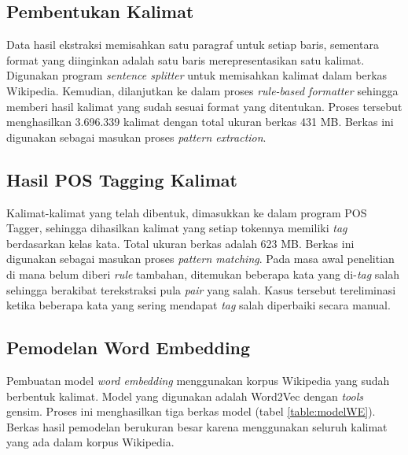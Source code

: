 \subsection{Pembentukan Kalimat}
Data hasil ekstraksi memisahkan satu paragraf untuk setiap baris, sementara format yang diinginkan adalah satu baris merepresentasikan satu kalimat. Digunakan program \textit{sentence splitter} untuk memisahkan kalimat dalam berkas Wikipedia. Kemudian, dilanjutkan ke dalam proses \textit{rule-based formatter} sehingga memberi hasil kalimat yang sudah sesuai format yang ditentukan. Proses tersebut menghasilkan 3.696.339 kalimat dengan total ukuran berkas 431 MB. Berkas ini digunakan sebagai masukan proses \textit{pattern extraction}. 

\subsection{Hasil POS Tagging Kalimat}
Kalimat-kalimat yang telah dibentuk, dimasukkan ke dalam program POS Tagger, sehingga dihasilkan kalimat yang setiap tokennya memiliki \textit{tag} berdasarkan kelas kata. Total ukuran berkas adalah 623 MB. Berkas ini digunakan sebagai masukan proses \textit{pattern matching}. Pada masa awal penelitian di mana belum diberi \textit{rule} tambahan, ditemukan beberapa kata yang di-\textit{tag} salah sehingga berakibat terekstraksi pula \textit{pair} yang salah. Kasus tersebut tereliminasi ketika beberapa kata yang sering mendapat \textit{tag} salah diperbaiki secara manual.

\subsection{Pemodelan Word Embedding}
Pembuatan model \textit{word embedding} menggunakan korpus Wikipedia yang sudah berbentuk kalimat. Model yang digunakan adalah Word2Vec dengan \textit{tools} gensim. Proses ini menghasilkan tiga berkas model (tabel \ref{table:modelWE}). Berkas hasil pemodelan berukuran besar karena menggunakan seluruh kalimat yang ada dalam korpus Wikipedia.

